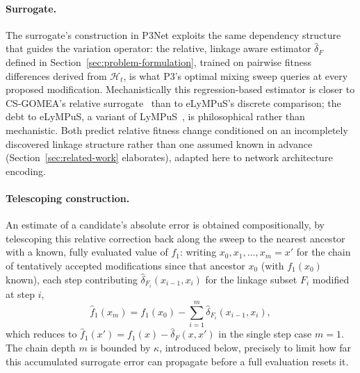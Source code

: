 \paragraph{Surrogate.} The surrogate's construction in P3Net exploits the same dependency structure that guides the variation operator: the relative, linkage aware estimator $\hat{\delta}_F$ defined in Section~\ref{sec:problem-formulation}, trained on pairwise fitness differences derived from $\mathcal{H}_t$, is what P3's optimal mixing sweep queries at every proposed modification. Mechanistically this regression-based estimator is closer to CS-GOMEA's relative surrogate~\citep{dushatskiy2019csgomea} than to eLyMPuS's discrete comparison; the debt to eLyMPuS, a variant of LyMPuS~\citep{przewozniczek2026lympus}, is philosophical rather than mechanistic. Both predict relative fitness change conditioned on an incompletely discovered linkage structure rather than one assumed known in advance (Section~\ref{sec:related-work} elaborates), adapted here to network architecture encoding.

\paragraph{Telescoping construction.} An estimate of a candidate's absolute error is obtained compositionally, by telescoping this relative correction back along the sweep to the nearest ancestor with a known, fully evaluated value of $f_1$: writing $x_0, x_1, \dots, x_m = x'$ for the chain of tentatively accepted modifications since that ancestor $x_0$ (with $f_1(x_0)$ known), each step contributing $\hat{\delta}_{F_i}(x_{i-1}, x_i)$ for the linkage subset $F_i$ modified at step $i$,
\[
    \hat{f}_1(x_m) = f_1(x_0) - \sum_{i=1}^{m} \hat{\delta}_{F_i}(x_{i-1}, x_i),
\]
which reduces to $\hat{f}_1(x') = f_1(x) - \hat{\delta}_F(x, x')$ in the single step case $m=1$. The chain depth $m$ is bounded by $\kappa$, introduced below, precisely to limit how far this accumulated surrogate error can propagate before a full evaluation resets it.

